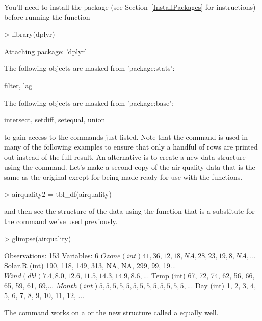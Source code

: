 You'll need to install the package (see Section~\ref{InstallPackages} for instructions) before running the function
\begin{Schunk}
\begin{Sinput}
> library(dplyr)
\end{Sinput}
\begin{Soutput}

Attaching package: 'dplyr'
\end{Soutput}
\begin{Soutput}
The following objects are masked from 'package:stats':

    filter, lag
\end{Soutput}
\begin{Soutput}
The following objects are masked from 'package:base':

    intersect, setdiff, setequal, union
\end{Soutput}
\end{Schunk}
to gain access to the commands just listed. Note that the  command is used in many of the following examples to ensure that only a handful of rows are printed out instead of the full result. An alternative is to create a new data structure using the  command. Let's make a second copy of the air quality data that is the same as the original except for being made ready for use with the  functions.
\begin{Schunk}
\begin{Sinput}
> airquality2 = tbl_df(airquality)
\end{Sinput}
\end{Schunk}
and then see the structure of the data using the  function that is a substitute for the  command we've used previously.
\begin{Schunk}
\begin{Sinput}
> glimpse(airquality)
\end{Sinput}
\begin{Soutput}
Observations: 153
Variables: 6
$ Ozone   (int) 41, 36, 12, 18, NA, 28, 23, 19, 8, NA, ...
$ Solar.R (int) 190, 118, 149, 313, NA, NA, 299, 99, 19...
$ Wind    (dbl) 7.4, 8.0, 12.6, 11.5, 14.3, 14.9, 8.6, ...
$ Temp    (int) 67, 72, 74, 62, 56, 66, 65, 59, 61, 69,...
$ Month   (int) 5, 5, 5, 5, 5, 5, 5, 5, 5, 5, 5, 5, 5, ...
$ Day     (int) 1, 2, 3, 4, 5, 6, 7, 8, 9, 10, 11, 12, ...
\end{Soutput}
\end{Schunk}
The  command works on a  or the new structure called a  equally well.
 
